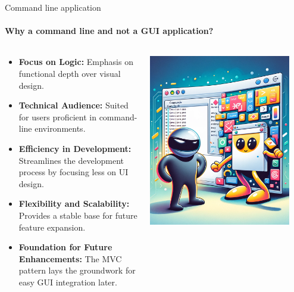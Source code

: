 \documentclass[
    ngerman,%
    authorontitle=true,
]{bfhbeamer}
\begin{document}
    
    \begin{frame}{Command line application}
    	\framesubtitle{Why a command line and not a GUI application?}
    	\begin{columns} %
    		\begin{column}{0.7\textwidth} %
    			\begin{itemize}
    				\item \textbf{Focus on Logic:} Emphasis on functional depth over visual design.
    				\item \textbf{Technical Audience:} Suited for users proficient in command-line environments.
    				\item \textbf{Efficiency in Development:} Streamlines the development process by focusing less on UI design.
    				\item \textbf{Flexibility and Scalability:} Provides a stable base for future feature expansion.
    				\item \textbf{Foundation for Future Enhancements:} The MVC pattern lays the groundwork for easy GUI integration later.
    			\end{itemize}
    		\end{column}
    		\begin{column}{0.3\textwidth} %
	    		\begin{center}
	    			\includegraphics[width=0.9\textwidth]{pictures/final_presentation/cmd_vs_gui.png}
	    		\end{center}
    		\end{column}
    	\end{columns}
    	
    \end{frame}
\end{document}
